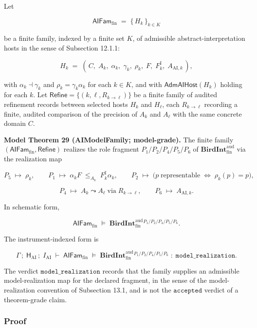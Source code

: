 \documentclass[11pt]{article}
\theoremstyle{definition}
\begin{document}
Let

\[
\mathsf{AIFam}_{\mathrm{fin}}\;=\;\{\,H_k\,\}_{k\in K}
\]

be a finite family, indexed by a finite set \(K\), of admissible abstract-interpretation hosts in the sense of Subsection 12.1.1:

\[
H_k\;=\;(\,C,\;A_k,\;\alpha_k,\;\gamma_k,\;\rho_k,\;F,\;F_k^{\sharp},\;A_{\mathrm{AI},k}\,),
\]

with \(\alpha_k\dashv\gamma_k\) and \(\rho_k=\gamma_k\alpha_k\) for each \(k\in K\), and with \(\mathsf{AdmAIHost}(H_k)\) holding for each \(k\). Let \(\mathsf{Refine}=\{(k,\ell,R_{k\to\ell})\}\) be a finite family of audited refinement records between selected hosts \(H_k\) and \(H_\ell\), each \(R_{k\to\ell}\) recording a finite, audited comparison of the precision of \(A_k\) and \(A_\ell\) with the same concrete domain \(C\).

\textbf{Model Theorem 29 (AIModelFamily; model-grade).} The finite family \((\mathsf{AIFam}_{\mathrm{fin}},\mathsf{Refine})\) realizes the role fragment \(P_1/P_2/P_4/P_5/P_6\) of \(\mathbf{BirdInt}^{\mathrm{aud}}_{\mathrm{fin}}\) via the realization map

\[
P_5\;\mapsto\;\rho_k,\qquad P_1\;\mapsto\;\alpha_k F\;\le_{A_k}\;F_k^{\sharp}\alpha_k,\qquad P_2\;\mapsto\;\bigl(p\;\text{representable}\;\Longleftrightarrow\;\rho_k(p)=p\bigr),
\]

\[
P_4\;\mapsto\;A_k\leadsto A_\ell\;\text{via}\;R_{k\to\ell},\qquad P_6\;\mapsto\;A_{\mathrm{AI},k}.
\]

In schematic form,

\[
\mathsf{AIFam}_{\mathrm{fin}}\;\models\;\mathbf{BirdInt}^{\mathrm{aud}}_{\mathrm{fin}}{}^{P_1/P_2/P_4/P_5/P_6}.
\]

The instrument-indexed form is

\[
\Gamma\,;\;\mathsf H_{\mathrm{AI}}\,;\;I_{\mathrm{AI}}\;\vdash\;\mathsf{AIFam}_{\mathrm{fin}}\;\models\;\mathbf{BirdInt}^{\mathrm{aud}}_{\mathrm{fin}}{}^{P_1/P_2/P_4/P_5/P_6}\;:\;\texttt{model\_realization}.
\]

The verdict \(\texttt{model\_realization}\) records that the family supplies an admissible model-realization map for the declared fragment, in the sense of the model-realization convention of Subsection 13.1, and is not the \(\texttt{accepted}\) verdict of a theorem-grade claim.

\subsubsection{Proof}
\end{document}

